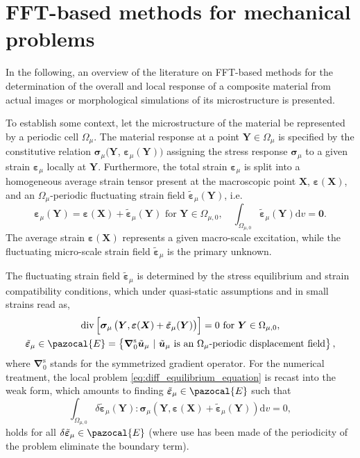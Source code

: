 \chapter{FFT-based methods for mechanical problems}

In the following, an overview of the literature on FFT-based methods for the determination of the overall and local response of a composite material from actual images or morphological simulations of its microstructure is presented.

To establish some context, let the microstructure of the material be represented by a periodic cell \(\Omega_\mu\).
The material response at a point \(\bm Y \in \Omega_\mu\) is specified by the constitutive relation \(\bm{\sigma}_\mu(\bm{Y}\), \(\bm\varepsilon_\mu(\bm{Y}))\) assigning the stress response \(\bm\sigma_\mu\) to a given strain \(\bm\varepsilon_\mu\) locally at \(\bm Y\).
Furthermore, the total strain \(\bm\varepsilon_\mu\) is split into a homogeneous average strain tensor present at the macroscopic point \(\bm X\), \(\bm \varepsilon(\bm X)\), and an \(\Omega_\mu\)-periodic fluctuating strain field \(\tilde{\bm \varepsilon}_\mu(\bm Y)\), i.e.
\begin{equation}
\bm\varepsilon_\mu(\bm{Y})=\bm \varepsilon(\bm X)+\tilde{\bm \varepsilon}_\mu(\bm{Y}) \text { for } \bm Y \in \Omega_{\mu,0}, \quad \int_{\Omega_{\mu,0} } \tilde{\bm\varepsilon}_\mu(\bm{Y}) \mathrm{d} v=\bm{0}.
\end{equation}
The average strain \(\bm \varepsilon(\bm X)\) represents a given macro-scale excitation, while the fluctuating micro-scale strain field \(\tilde{\bm\varepsilon}_\mu\) is the primary unknown.

The fluctuating strain field \(\tilde{\bm\varepsilon}_\mu\) is determined by the stress equilibrium and strain compatibility conditions, which under quasi-static assumptions and in small strains read as,
\begin{gather}\label{eq:diff_equilibrium_equation}
\operatorname{div}\left[\bm{\sigma}_\mu\left(\bm Y, \bm \varepsilon(\bm X)+\tilde{\bm\varepsilon}_\mu(\bm Y)\right)\right]=0 \text { for } \bm Y \in \Omega_{\mu,0},\\
\label{eq:compatibility_equations}
\tilde{\bm\varepsilon}_\mu \in \pazocal{E}=\left\{\bm{\nabla}_0^{\mathrm{s}} \tilde{\bm{u}}_\mu\ |\ \text{\(\tilde{\bm{u}}_\mu\) is an \(\Omega_\mu\)-periodic displacement field}\right\},
\end{gather}
where \(\bm{\nabla}_0^{\mathrm{s}}\) stands for the symmetrized gradient operator.
For the numerical treatment, the local problem \eqref{eq:diff_equilibrium_equation} is recast into the weak form, which amounts to finding \(\tilde{\bm\varepsilon}_\mu \in \pazocal{E}\) such that
\begin{equation} \label{eq:weak_form_equilibrium_eq}
\int_{\Omega_{\mu,0}} \delta \tilde{\bm\varepsilon}_\mu(\bm{Y}): \bm{\sigma}_\mu\left(\bm Y, \bm \varepsilon(\bm X)+\tilde{\bm\varepsilon}_\mu(\bm Y)\right) \mathrm{d}v = 0,
\end{equation}
holds for all \(\delta \tilde{\bm\varepsilon}_\mu \in \pazocal{E}\) (where use has been made of the periodicity of the problem eliminate the boundary term).

